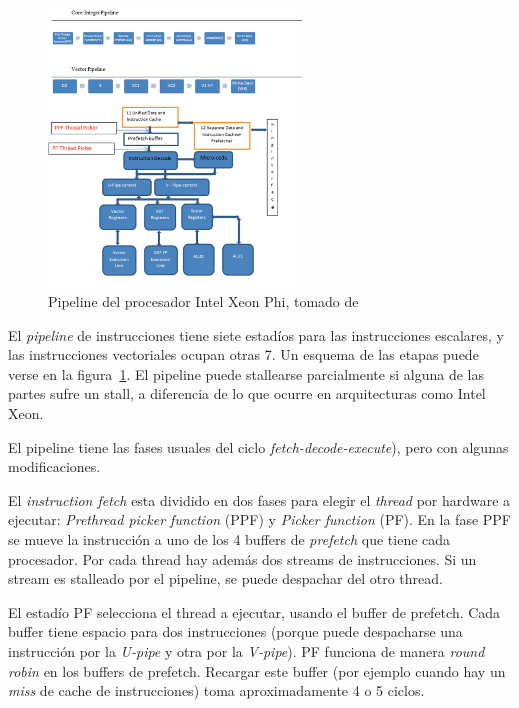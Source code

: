 \begin{figure}[htbp]
   \centering
   \includegraphics[width=0.6\textwidth]{images/xeon-phi-pipeline.png}
   \caption{Pipeline del procesador Intel Xeon Phi, tomado de~\cite{XeonPhiBook} }
   \label{fig::xeon_phi_pipeline}
\end{figure}


El \textit{pipeline} de instrucciones tiene siete estad\'ios para las instrucciones escalares, y las
instrucciones vectoriales ocupan otras 7. Un esquema de las etapas puede verse en la figura~\ref{fig::xeon_phi_pipeline}.
El pipeline puede stallearse parcialmente si alguna de las partes sufre un stall, a diferencia de lo que ocurre en 
arquitecturas como Intel Xeon.

El pipeline tiene las fases usuales del ciclo \textit{fetch-decode-execute}), pero con algunas modificaciones.

El \textit{instruction fetch} esta dividido en dos fases para elegir el \textit{thread} por hardware a ejecutar:
\textit{Prethread picker function} (PPF) y \textit{Picker function} (PF). En la fase PPF se mueve la instrucci\'on
a uno de los 4 buffers de \textit{prefetch} que tiene cada procesador. Por cada thread hay adem\'as dos streams de
instrucciones. Si un stream es stalleado por el pipeline, se puede despachar del otro thread.

El estad\'io PF selecciona el thread a ejecutar, usando el buffer de prefetch. Cada buffer tiene espacio para dos
instrucciones (porque puede despacharse una instrucci\'on por la \textit{U-pipe} y otra por la \textit{V-pipe}). PF
funciona de manera \textit{round robin} en los buffers de prefetch. Recargar este buffer (por ejemplo cuando hay un
\textit{miss} de cache de instrucciones) toma aproximadamente 4 o 5 ciclos.

